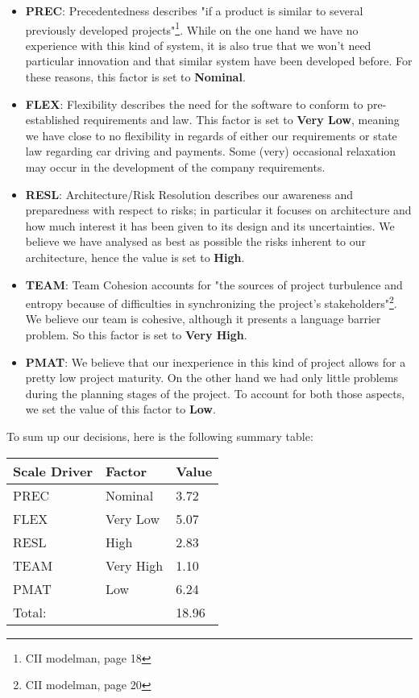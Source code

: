 \begin{itemize}
	\item \textbf{PREC}: Precedentedness describes "if a product is similar to several previously developed projects"\footnote{CII modelman, page 18}. While on the one hand we have no experience with this kind of system, it is also true that we won't need particular innovation and that similar system have been developed before. For these reasons, this factor is set to \textbf{Nominal}.
	\item \textbf{FLEX}: Flexibility describes the need for the software to conform to pre-established requirements and law. This factor is set to \textbf{Very Low}, meaning we have close to no flexibility in regards of either our requirements or state law regarding car driving and payments. Some (very) occasional relaxation may occur in the development of the company requirements. 
	\item \textbf{RESL}: Architecture/Risk Resolution describes our awareness and preparedness with respect to risks; in particular it focuses on architecture and how much interest it has been given to its design and its uncertainties. We believe we have analysed as best as possible the risks inherent to our architecture, hence the value is set to \textbf{High}.
	\item \textbf{TEAM}: Team Cohesion accounts for "the sources of project turbulence and entropy because of difficulties in synchronizing the project’s stakeholders"\footnote{CII modelman, page 20}. We believe our team is cohesive, although it presents a language barrier problem. So this factor is set to \textbf{Very High}.
	\item \textbf{PMAT}: We believe that our inexperience in this kind of project allows for a pretty low project maturity. On the other hand we had only little problems during the planning stages of the project. To account for both those aspects, we set the value of this factor to \textbf{Low}. 
\end{itemize}


To sum up our decisions, here is the following summary table:\\

\begin{center}
	\begin{tabular}{|l|l|l|}
		\hline
		\textbf{Scale Driver} & \textbf{Factor} & \textbf{Value}\\ \hline
		
		PREC & Nominal & 3.72\\
		FLEX & Very Low & 5.07\\
		RESL & High & 2.83\\
		TEAM & Very High & 1.10\\
		PMAT & Low & 6.24\\ \hline
		\multicolumn{2}{|l|}{Total:} & 18.96\\ \hline
	\end{tabular}
\end{center}



